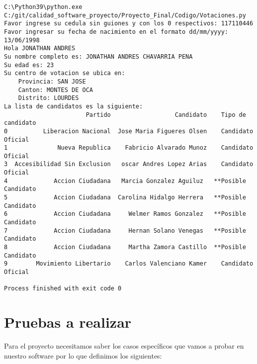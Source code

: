 \documentclass[conference]{IEEEtran}
\begin{document}
\begin{lstlisting}[style=CMD_small]
C:\Python39\python.exe C:/git/calidad_software_proyecto/Proyecto_Final/Codigo/Votaciones.py
Favor ingrese su cedula sin guiones y con los 0 respectivos: 117110446
Favor ingresar su fecha de nacimiento en el formato dd/mm/yyyy: 13/06/1998
Hola JONATHAN ANDRES
Su nombre completo es: JONATHAN ANDRES CHAVARRIA PENA
Su edad es: 23
Su centro de votacion se ubica en:
	Provincia: SAN JOSE
	Canton: MONTES DE OCA
	Distrito: LOURDES
La lista de candidatos es la siguiente:
                       Partido                  Candidato    Tipo de candidato
0          Liberacion Nacional  Jose Maria Figueres Olsen    Candidato Oficial
1              Nueva Republica    Fabricio Alvarado Munoz    Candidato Oficial
3  Accesibilidad Sin Exclusion   oscar Andres Lopez Arias    Candidato Oficial
4             Accion Ciudadana   Marcia Gonzalez Aguiluz   **Posible Candidato
5             Accion Ciudadana  Carolina Hidalgo Herrera   **Posible Candidato
6             Accion Ciudadana     Welmer Ramos Gonzalez   **Posible Candidato
7             Accion Ciudadana     Hernan Solano Venegas   **Posible Candidato
8             Accion Ciudadana     Martha Zamora Castillo  **Posible Candidato
9        Movimiento Libertario    Carlos Valenciano Kamer    Candidato Oficial

Process finished with exit code 0
\end{lstlisting}



\section{Pruebas a realizar}

Para el proyecto necesitamos saber los casos específicos que vamos a probar en nuestro software por lo que definimos los siguientes:
\end{document}

